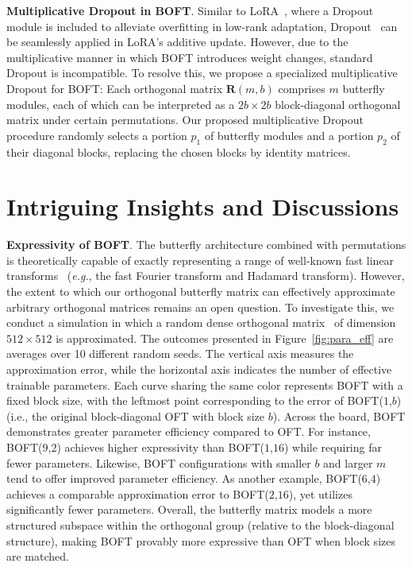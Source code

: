 \textbf{Multiplicative Dropout in BOFT}. Similar to LoRA~\cite{hulora2022}, where a Dropout module is included to alleviate overfitting in low-rank adaptation, Dropout~\cite{srivastava2014dropout} can be seamlessly applied in LoRA’s additive update. However, due to the multiplicative manner in which BOFT introduces weight changes, standard Dropout is incompatible. To resolve this, we propose a specialized multiplicative Dropout for BOFT: Each orthogonal matrix $\bm{R}(m,b)$ comprises $m$ butterfly modules, each of which can be interpreted as a $2b\times 2b$ block-diagonal orthogonal matrix under certain permutations. Our proposed multiplicative Dropout procedure randomly selects a portion $p_1$ of butterfly modules and a portion $p_2$ of their diagonal blocks, replacing the chosen blocks by identity matrices.

\section{Intriguing Insights and Discussions}

\textbf{Expressivity of BOFT}. The butterfly architecture combined with permutations is theoretically capable of exactly representing a range of well-known fast linear transforms~\cite{dao2019learning,dao2019kaleidoscope} (\emph{e.g.}, the fast Fourier transform and Hadamard transform). However, the extent to which our orthogonal butterfly matrix can effectively approximate arbitrary orthogonal matrices remains an open question. To investigate this, we conduct a simulation in which a random dense orthogonal matrix~\cite{anderson1987generation} of dimension $512\times 512$ is approximated. The outcomes presented in Figure~\ref{fig:para_eff} are averages over 10 different random seeds. The vertical axis measures the approximation error, while the horizontal axis indicates the number of effective trainable parameters. Each curve sharing the same color represents BOFT with a fixed block size, with the leftmost point corresponding to the error of BOFT($1$,$b$) (i.e., the original block-diagonal OFT with block size $b$). Across the board, BOFT demonstrates greater parameter efficiency compared to OFT. For instance, BOFT($9$,$2$) achieves higher expressivity than BOFT($1$,$16$) while requiring far fewer parameters. Likewise, BOFT configurations with smaller $b$ and larger $m$ tend to offer improved parameter efficiency. As another example, BOFT($6$,$4$) achieves a comparable approximation error to BOFT($2$,$16$), yet utilizes significantly fewer parameters. Overall, the butterfly matrix models a more structured subspace within the orthogonal group (relative to the block-diagonal structure), making BOFT provably more expressive than OFT when block sizes are matched.

